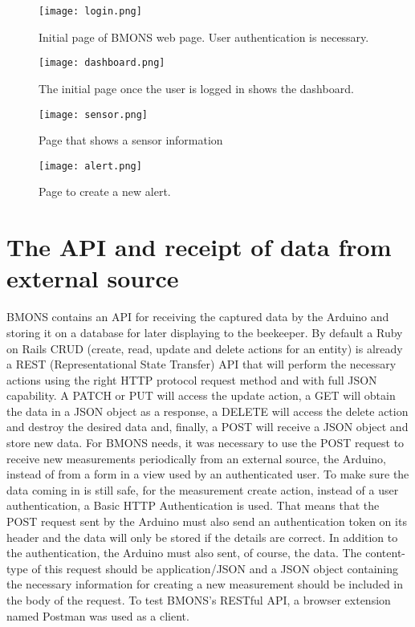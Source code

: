 \clearpage
\begin{figure}[h]
\centering\texttt{[image: login.png]}
\caption{\label{fig:login} Initial page of BMONS web page. User authentication is necessary. }
\end{figure}

\begin{figure}[h]
\centering\texttt{[image: dashboard.png]}
\caption{\label{fig:dashboard} The initial page once the user is logged in shows the dashboard. }
\end{figure}

\begin{figure}[h]
\centering\texttt{[image: sensor.png]}
\caption{\label{fig:sensor} Page that shows a sensor information }
\end{figure}

\begin{figure}[h]
\centering\texttt{[image: alert.png]}
\caption{\label{fig:alert} Page to create a new alert. }
\end{figure}

\clearpage

\section{The API and receipt of data from external source}

BMONS contains an API for receiving the captured data by the Arduino and storing it on a database for later displaying to the beekeeper. By default a Ruby on Rails CRUD (create, read, update and delete actions for an entity) is already a REST (Representational State Transfer) API that will perform the necessary actions using the right HTTP protocol request method and with full JSON capability. A PATCH or PUT will access the update action, a GET will obtain the data in a JSON object as a response, a DELETE will access the delete action and destroy the desired data and, finally, a POST will receive a JSON object and store new data. For BMONS needs, it was necessary to use the POST request to receive new measurements periodically from an external source, the Arduino, instead of from a form in a view used by an authenticated user. To make sure the data coming in is still safe, for the measurement create action, instead of a user authentication, a Basic HTTP Authentication is used. That means that the POST request sent by the Arduino must also send an authentication token on its header and the data will only be stored if the details are correct. In addition to the authentication, the Arduino must also sent, of course, the data. The content-type of this request should be application/JSON and a JSON object containing the necessary information for creating a new measurement should be included in the body of the request. To test BMONS's RESTful API, a browser extension named Postman was used as a client. 
